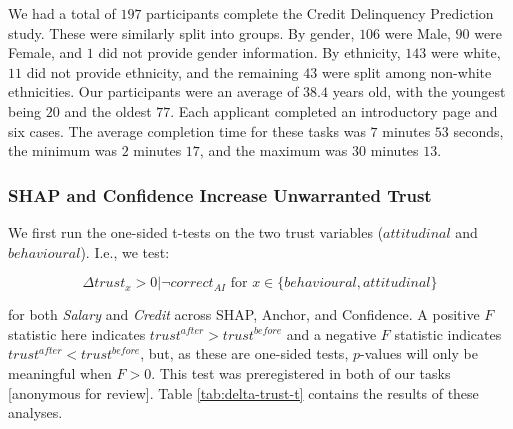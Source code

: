 We had a total of $197$ participants complete the Credit Delinquency Prediction study. These were similarly split into groups. By gender, $106$ were Male, $90$ were Female, and $1$ did not provide gender information. By ethnicity, $143$ were white, $11$ did not provide ethnicity, and the remaining $43$ were split among non-white ethnicities. Our participants were an average of $38.4$ years old, with the youngest being $20$ and the oldest $77$. Each applicant completed an introductory page and six cases. The average completion time for these tasks was $7$ minutes $53$ seconds, the minimum was $2$ minutes $17$, and the maximum was $30$ minutes $13$.

\subsubsection{SHAP and Confidence Increase Unwarranted Trust}
We first run the one-sided t-tests on the two trust variables ($attitudinal$ and $behavioural$). I.e., we test:

\begin{equation}
    \Delta trust_{x} > 0 | \neg correct_{AI} \text{ for } x \in \{behavioural, attitudinal\}
\end{equation}

\noindent for both \emph{Salary} and \emph{Credit} across SHAP, Anchor, and Confidence. A positive $F$ statistic here indicates $trust^{after} > trust^{before}$ and a negative $F$ statistic indicates $trust^{after} < trust^{before}$, but, as these are one-sided tests, $p$-values will only be meaningful when $F > 0$. This test was preregistered in both of our tasks [anonymous for review]. Table \ref{tab:delta-trust-t} contains the results of these analyses.  

